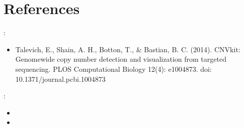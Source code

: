 \documentclass[letterpaper,10pt,english]{sphinxhowto}
\begin{document}
\section{References}
\label{\detokenize{index:references}}
\sphinxAtStartPar
{}:
\begin{itemize}
\item {} 
\sphinxAtStartPar
Talevich, E., Shain, A. H., Botton, T., \& Bastian, B. C. (2014). CNVkit: Genome\sphinxhyphen{}wide copy number detection and visualization from targeted sequencing. PLOS Computational Biology 12(4): e1004873. doi: 10.1371/journal.pcbi.1004873

\end{itemize}

\sphinxAtStartPar
{}:
\begin{itemize}
\item {} 
\sphinxAtStartPar
{}

\item {} 
\sphinxAtStartPar
{}

\end{itemize}



\renewcommand{\indexname}{Index}
\printindex
\end{document}
